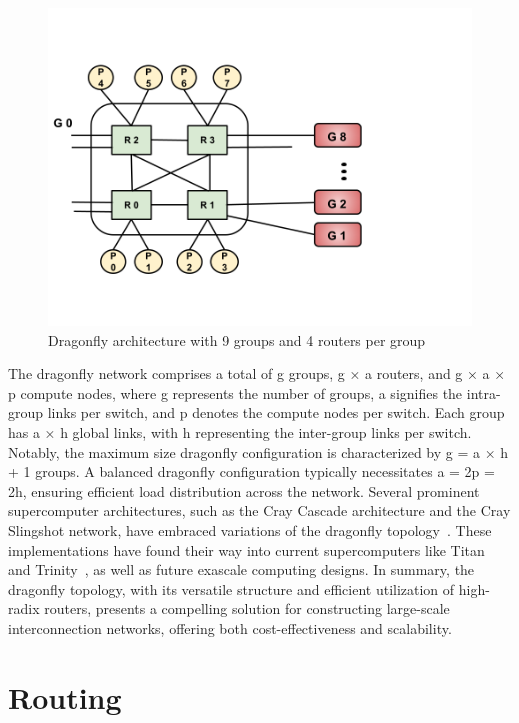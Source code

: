 \begin{figure}[h!]
  \centering
  \includegraphics[width=0.8\columnwidth]{figs/dfly1.png}
  \caption{Dragonfly architecture with 9 groups and 4 routers per group}
  \label{fig:dfly}
\end{figure}


The dragonfly network comprises a total of
g groups, g × a routers, and g × a × p compute nodes, where g represents the
number of groups, a signifies the intra-group links per switch, and p
denotes the compute nodes per switch. Each group has a × h global links, with
h representing the inter-group links per switch. Notably, the maximum size
dragonfly configuration is characterized by g = a × h + 1 groups.  A balanced
dragonfly configuration typically necessitates a = 2p = 2h, ensuring efficient
load distribution across the network.  Several prominent supercomputer
architectures, such as the Cray Cascade architecture and the Cray Slingshot
network, have embraced variations of the dragonfly topology~\cite{faanes2012cray, de2020depth}. These
implementations have found their way into current supercomputers like Titan~\cite{titan} and
Trinity~\cite{archer2015trinity}, as well as future exascale computing designs.  In summary, the
dragonfly topology, with its versatile structure and efficient utilization of
high-radix routers, presents a compelling solution for constructing large-scale
interconnection networks, offering both cost-effectiveness and scalability.

\section{Routing}

